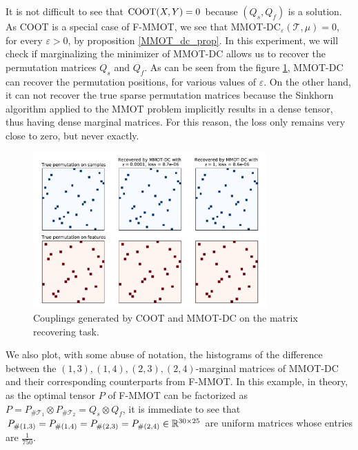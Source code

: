 It is not difficult to see that $\text{COOT}(X,Y) = 0$ because $(Q_s, Q_f)$ is a solution. As COOT is a special case of F-MMOT,
we see that $\text{MMOT-DC}_{\varepsilon}(\mathcal T, \mu) = 0$, for every $\varepsilon > 0$,
by proposition \ref{MMOT_dc_prop}. In this experiment, we will check if marginalizing the minimizer of MMOT-DC allows us to recover
the permutation matrices $Q_s$ and $Q_f$.
As can be seen from the figure \ref{fig:permu}, MMOT-DC can recover the permutation positions, for various
values of $\varepsilon$. On the other hand, it can not recover the true sparse permutation matrices because the Sinkhorn algorithm
applied to the MMOT problem implicitly results in a dense tensor, thus having dense marginal matrices. For this reason,
the loss only remains very close to zero, but never exactly.
\begin{figure}[t]
  \centering
  \includegraphics[width=0.8\textwidth,height=0.8\textheight,keepaspectratio]{./Chapitre2/fig/compare_methods.pdf}
  \caption{Couplings generated by COOT and MMOT-DC on the matrix recovering task.}
  \label{fig:permu}
\end{figure}
We also plot, with some abuse of notation, the histograms of the difference between
the $(1,3), (1,4), (2,3), (2,4)$-marginal matrices of MMOT-DC and their corresponding counterparts from F-MMOT.
In this example, in theory, as the optimal tensor $P$ of F-MMOT can be factorized as
$P = P_{\# \mathcal T_1} \otimes P_{\# \mathcal T_2} = Q_s \otimes Q_f$,
it is immediate to see that $P_{\# (1,3)} = P_{\# (1,4)} = P_{\# (2,3)} = P_{\# (2,4)} \in \mathbb R^{30 \times 25}$
are uniform matrices whose entries are $\frac{1}{750}$.

